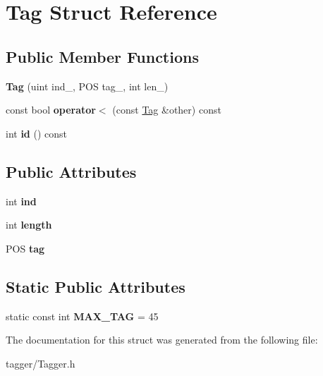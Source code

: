 \hypertarget{struct_tag}{
\section{Tag Struct Reference}
\label{struct_tag}
}
\subsection*{Public Member Functions}
\begin{DoxyCompactItemize}
\item 
\hypertarget{struct_tag_ab32833339e272705062ac1a5d5f1ca10}{
{\bfseries Tag} (uint ind\_\-, POS tag\_\-, int len\_\-)}
\label{struct_tag_ab32833339e272705062ac1a5d5f1ca10}

\item 
\hypertarget{struct_tag_aed3aabe09176d4a6acbb2cc7b3170228}{
const bool {\bfseries operator$<$} (const \hyperlink{struct_tag}{Tag} \&other) const }
\label{struct_tag_aed3aabe09176d4a6acbb2cc7b3170228}

\item 
\hypertarget{struct_tag_a5458e1229013075f4597c1dba313ce83}{
int {\bfseries id} () const }
\label{struct_tag_a5458e1229013075f4597c1dba313ce83}

\end{DoxyCompactItemize}
\subsection*{Public Attributes}
\begin{DoxyCompactItemize}
\item 
\hypertarget{struct_tag_a072cbc6c6ac82c2398ad409a5eb28b71}{
int {\bfseries ind}}
\label{struct_tag_a072cbc6c6ac82c2398ad409a5eb28b71}

\item 
\hypertarget{struct_tag_a7b67562e1a664c9fed9afb74902b0fe5}{
int {\bfseries length}}
\label{struct_tag_a7b67562e1a664c9fed9afb74902b0fe5}

\item 
\hypertarget{struct_tag_a5f97e5e57a82b467da83f2990a276e81}{
POS {\bfseries tag}}
\label{struct_tag_a5f97e5e57a82b467da83f2990a276e81}

\end{DoxyCompactItemize}
\subsection*{Static Public Attributes}
\begin{DoxyCompactItemize}
\item 
\hypertarget{struct_tag_acb96fe3a41181e0e10628ae00fe63878}{
static const int {\bfseries MAX\_\-TAG} = 45}
\label{struct_tag_acb96fe3a41181e0e10628ae00fe63878}

\end{DoxyCompactItemize}


The documentation for this struct was generated from the following file:\begin{DoxyCompactItemize}
\item 
tagger/Tagger.h\end{DoxyCompactItemize}
